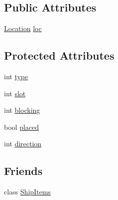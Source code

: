 \subsection*{Public Attributes}
\begin{DoxyCompactItemize}
\item 
\hyperlink{structLocation}{Location} \hyperlink{classItem_ade907eeeea58df68fcacde1e5568779b}{loc}
\end{DoxyCompactItemize}
\subsection*{Protected Attributes}
\begin{DoxyCompactItemize}
\item 
int \hyperlink{classItem_a22a98aed7ce8f0314b597a5739c415b7}{type}
\item 
int \hyperlink{classItem_adcfbfc3a87d2112c62b812dac2c72993}{slot}
\item 
int \hyperlink{classItem_a5166900b24ba9e746a7ad34c00353cdd}{blocking}
\item 
bool \hyperlink{classItem_a0b61e2b275f9a5958d7238a0d6578235}{placed}
\item 
int \hyperlink{classItem_a1812b51dc93d2142c0641c536fbef617}{direction}
\end{DoxyCompactItemize}
\subsection*{Friends}
\begin{DoxyCompactItemize}
\item 
class \hyperlink{classItem_a93f19dfd48656b5ff656596791c0923d}{Ship\-Items}
\end{DoxyCompactItemize}


